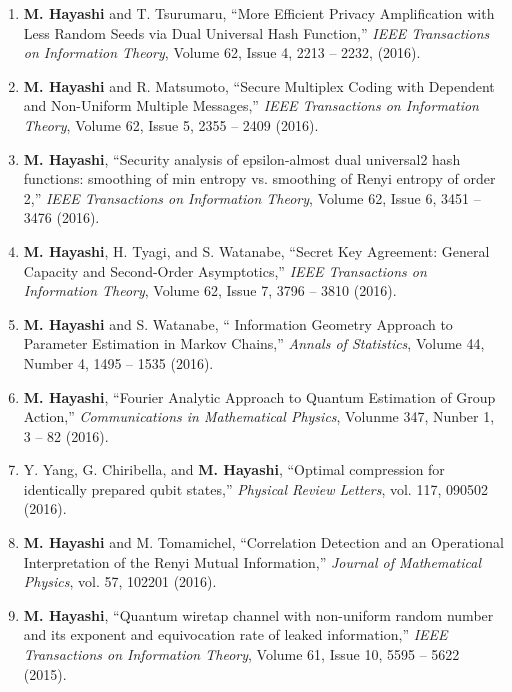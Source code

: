\documentclass[a4paper,12pt,oneside]{article}
\begin{document}
\begin{enumerate}
\item 
\textbf{M. Hayashi} and T. Tsurumaru, ``More Efficient Privacy Amplification with Less Random Seeds via Dual Universal Hash Function,'' 
{\em IEEE Transactions on Information Theory}, 
Volume 62, Issue 4, 2213 -- 2232, (2016). 

\item 
\textbf{M. Hayashi} and R. Matsumoto, ``Secure Multiplex Coding with Dependent and Non-Uniform Multiple Messages,'' 
{\em IEEE Transactions on Information Theory}, Volume 62, Issue 5, 2355 -- 2409 (2016). 

\item 
\textbf{M. Hayashi}, ``Security analysis of epsilon-almost dual universal2 hash functions: smoothing of min entropy vs. smoothing of Renyi entropy of order 2,'' 
{\em IEEE Transactions on Information Theory}, Volume 62, Issue 6, 3451 -- 3476 (2016). 

\item 
\textbf{M. Hayashi}, H. Tyagi, and S. Watanabe, ``Secret Key Agreement: General Capacity and Second-Order Asymptotics,'' 
{\em IEEE Transactions on Information Theory}, Volume 62, Issue 7, 3796 -- 3810 (2016). 

\item 
\textbf{M. Hayashi} and S. Watanabe, `` Information Geometry Approach to Parameter Estimation in Markov Chains,'' 
{\em Annals of Statistics}, Volume 44, Number 4, 1495 -- 1535 (2016). 

\item 
\textbf{M. Hayashi}, 
``Fourier Analytic Approach to Quantum Estimation of Group Action,'' 
{\em Communications in Mathematical Physics}, Volunme 347, Nunber 1, 3 -- 82 (2016). 

\item 
Y. Yang, G. Chiribella, and \textbf{M. Hayashi}, 
``Optimal compression for identically prepared qubit states,'' 
{\em Physical Review Letters}, vol. 117, 090502 (2016).

\item 
\textbf{M. Hayashi} and M. Tomamichel, 
``Correlation Detection and an Operational Interpretation of the Renyi Mutual Information,'' 
{\em Journal of Mathematical Physics}, vol. 57, 102201 (2016).

\item 
\textbf{M. Hayashi}, ``Quantum wiretap channel with non-uniform random number and its exponent and equivocation rate of leaked information,'' 
{\em IEEE Transactions on Information Theory}, Volume 61, Issue 10, 5595 -- 5622 (2015). 


\end{enumerate}
\end{document}
